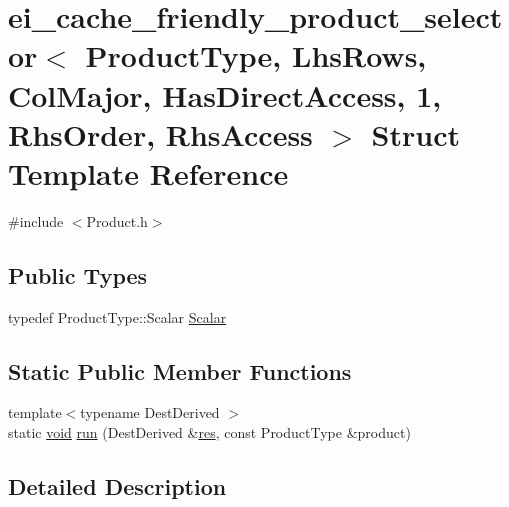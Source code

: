 \hypertarget{structei__cache__friendly__product__selector_3_01_product_type_00_01_lhs_rows_00_01_col_major_00d6a68bd0827e14ef88646c749f85d9a1}{\section{ei\-\_\-cache\-\_\-friendly\-\_\-product\-\_\-selector$<$ Product\-Type, Lhs\-Rows, Col\-Major, Has\-Direct\-Access, 1, Rhs\-Order, Rhs\-Access $>$ Struct Template Reference}
\label{structei__cache__friendly__product__selector_3_01_product_type_00_01_lhs_rows_00_01_col_major_00d6a68bd0827e14ef88646c749f85d9a1}
}


{\ttfamily \#include $<$Product.\-h$>$}

\subsection*{Public Types}
\begin{DoxyCompactItemize}
\item 
typedef Product\-Type\-::\-Scalar \hyperlink{structei__cache__friendly__product__selector_3_01_product_type_00_01_lhs_rows_00_01_col_major_00d6a68bd0827e14ef88646c749f85d9a1_ad570b476d0c072b2c5d4ca2fff9a09d3}{Scalar}
\end{DoxyCompactItemize}
\subsection*{Static Public Member Functions}
\begin{DoxyCompactItemize}
\item 
{\footnotesize template$<$typename Dest\-Derived $>$ }\\static \hyperlink{group___u_a_v_objects_plugin_ga444cf2ff3f0ecbe028adce838d373f5c}{void} \hyperlink{structei__cache__friendly__product__selector_3_01_product_type_00_01_lhs_rows_00_01_col_major_00d6a68bd0827e14ef88646c749f85d9a1_ab6829de9b05616cc56c3f168ada6e986}{run} (Dest\-Derived \&\hyperlink{glext_8h_a1dbb21208b9047cc8031ca9c840d3c2f}{res}, const Product\-Type \&product)
\end{DoxyCompactItemize}


\subsection{Detailed Description}
